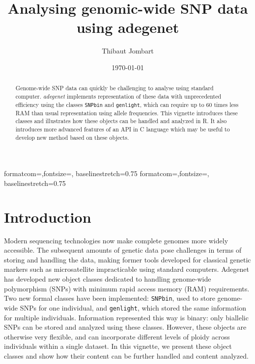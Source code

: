 \documentclass{article}
\title{Analysing genomic-wide SNP data using adegenet}
\author{Thibaut Jombart}
\date{\today}
\begin{document}
{formatcom={\color{Sinput}},fontsize=\footnotesize, baselinestretch=0.75}
{formatcom={\color{Soutput}},fontsize=\footnotesize, baselinestretch=0.75}

\color{black}

\maketitle

\begin{abstract}
  Genome-wide SNP data can quickly be challenging to analyse using standard
  computer. \textit{adegenet} implements representation of these data with unprecedented efficiency
  using the classes \texttt{SNPbin} and \texttt{genlight}, which can require up to 60 times less RAM than usual
  representation using allele frequencies.
  This vignette introduces these classes and illustrates how these objects can be handled and
  analyzed in R.
  It also introduces more advanced features of an API in C language which may be useful to develop
  new method based on these objects.
\end{abstract}

\newpage

\tableofcontents


\newpage
\section{Introduction}
Modern sequencing technologies now make complete genomes more widely accessible.
The subsequent amounts of genetic data pose challenges in terms of storing and handling the data,
making former tools developed for classical genetic markers such as microsatellite impracticable using
standard computers.
Adegenet has developed new object classes dedicated to handling genome-wide polymorphism (SNPs) with
minimum rapid access memory (RAM) requirements.
\\

Two new formal classes have been implemented: \texttt{SNPbin}, used to store genome-wide SNPs for
one individual, and \texttt{genlight}, which stored the same information for multiple individuals.
Information represented this way is binary: only biallelic SNPs can be stored and analyzed using these classes.
However, these objects are otherwise very flexible, and can incorporate different levels of ploidy
across individuals within a single dataset.
In this vignette, we present these object classes and show how their content can be further handled and
content analyzed.
\end{document}
